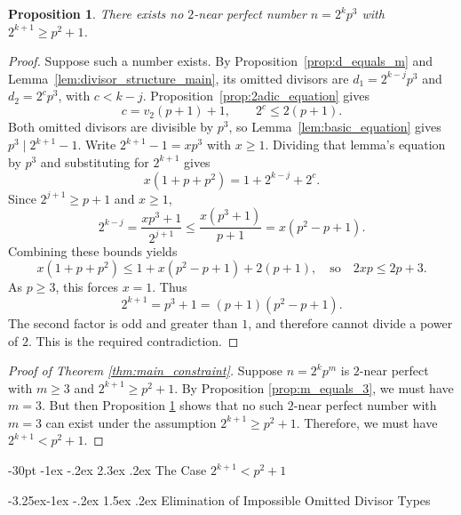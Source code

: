 \documentclass[10pt]{article}
\makeatletter
\renewcommand\section{\@startsection {section}{1}{\z@}
{-30pt \@plus -1ex \@minus -.2ex}
{2.3ex \@plus.2ex}
{\normalfont\normalsize\bfseries\boldmath}}
\renewcommand\subsection{\@startsection{subsection}{2}{\z@}
{-3.25ex\@plus -1ex \@minus -.2ex}
{1.5ex \@plus .2ex}
{\normalfont\normalsize\bfseries\boldmath}}
\newtheorem{proposition}{Proposition}
\theoremstyle{definition}
\makeatother
\begin{document}
\begin{proposition}\label{prop:final_contradiction}
There exists no $2$-near perfect number $n=2^kp^3$ with $2^{k+1}\geq p^2+1$.
\end{proposition}

\begin{proof}
Suppose such a number exists. By Proposition~\ref{prop:d_equals_m}
and Lemma~\ref{lem:divisor_structure_main}, its omitted divisors are
$d_1=2^{k-j}p^3$ and $d_2=2^cp^3$, with $c<k-j$.
Proposition~\ref{prop:2adic_equation} gives
\[
c=v_2(p+1)+1,\qquad 2^c\le2(p+1).
\]
Both omitted divisors are divisible by $p^3$, so
Lemma~\ref{lem:basic_equation} gives $p^3\mid2^{k+1}-1$.
Write $2^{k+1}-1=xp^3$ with $x\ge1$.
Dividing that lemma's equation by $p^3$ and substituting for
$2^{k+1}$ gives
\[
x(1+p+p^2)=1+2^{k-j}+2^c.
\]
Since $2^{j+1}\ge p+1$ and $x\ge1$,
\[
2^{k-j}=\frac{xp^3+1}{2^{j+1}}
\le\frac{x(p^3+1)}{p+1}=x(p^2-p+1).
\]
Combining these bounds yields
\[
x(1+p+p^2)\le1+x(p^2-p+1)+2(p+1),
\quad\text{so}\quad 2xp\le2p+3.
\]
As $p\ge3$, this forces $x=1$. Thus
\[
2^{k+1}=p^3+1=(p+1)(p^2-p+1).
\]
The second factor is odd and greater than $1$, and therefore cannot
divide a power of $2$. This is the required contradiction.
\end{proof}

\begin{proof}[Proof of Theorem \ref{thm:main_constraint}]
Suppose $n=2^kp^m$ is $2$-near perfect with $m \geq 3$ and $2^{k+1} \geq p^2+1$. By Proposition \ref{prop:m_equals_3}, we must have $m = 3$. But then Proposition \ref{prop:final_contradiction} shows that no such $2$-near perfect number with $m = 3$ can exist under the assumption $2^{k+1} \geq p^2+1$. Therefore, we must have $2^{k+1} < p^2+1$.
\end{proof}



\section{The Case $2^{k+1} < p^2+1$}
\label{sec:case2}

\subsection{Elimination of Impossible Omitted Divisor Types}
\label{sec:no-impossible-omitted}
\end{document}
